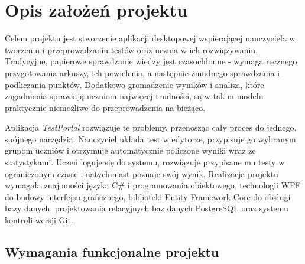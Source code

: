 ﻿\chapter{Opis założeń projektu}
\label{cha:zalozenia}

Celem projektu jest stworzenie aplikacji desktopowej wspierającej nauczyciela w tworzeniu
i przeprowadzaniu testów oraz ucznia w ich rozwiązywaniu. Tradycyjne, papierowe sprawdzanie wiedzy
jest czasochłonne - wymaga ręcznego przygotowania arkuszy, ich powielenia, a następnie żmudnego
sprawdzania i podliczania punktów. Dodatkowo gromadzenie wyników i analiza, które zagadnienia
sprawiają uczniom najwięcej trudności, są w takim modelu praktycznie niemożliwe do przeprowadzenia
na bieżąco.

Aplikacja \emph{TestPortal} rozwiązuje te problemy, przenosząc cały proces do jednego, spójnego
narzędzia. Nauczyciel układa test w edytorze, przypisuje go wybranym grupom uczniów i otrzymuje
automatycznie policzone wyniki wraz ze statystykami. Uczeń loguje się do systemu, rozwiązuje
przypisane mu testy w ograniczonym czasie i natychmiast poznaje swój wynik. Realizacja projektu
wymagała znajomości języka C\# i programowania obiektowego, technologii WPF do budowy interfejsu
graficznego, biblioteki Entity Framework Core do obsługi bazy danych, projektowania relacyjnych baz
danych PostgreSQL oraz systemu kontroli wersji Git.

\section{Wymagania funkcjonalne projektu}
\label{sec:wymaganiaFunkcjonalne}

